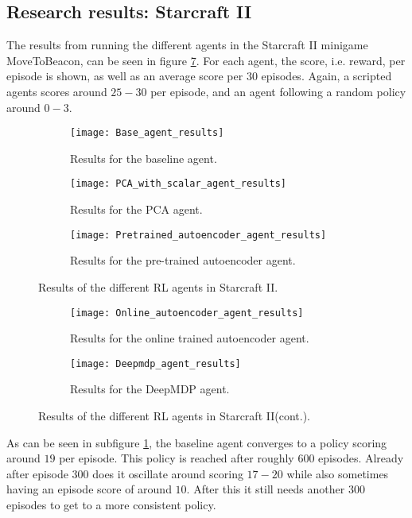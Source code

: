 \subsection{Research results: Starcraft II}\label{research-results-pysc2}
The results from running the different agents in the Starcraft II minigame MoveToBeacon, can be seen in figure \ref{fig:results-agents}. For each agent, the score, i.e. reward, per episode is shown, as well as an average score per $30$ episodes. Again, a scripted agents scores around $25-30$ per episode, and an agent following a random policy around $0-3$.


\begin{figure}[h!]
	\centering
	\begin{subfigure}[b]{0.75\textwidth}
		\texttt{[image: Base\_agent\_results]}
		\caption{Results for the baseline agent.}
		\label{fig:results-base} 
	\end{subfigure}
	\begin{subfigure}[b]{0.75\textwidth}
		\texttt{[image: PCA\_with\_scalar\_agent\_results]}
		\caption{Results for the PCA agent.}
		\label{fig:results-pca}
	\end{subfigure}
	\begin{subfigure}[b]{0.75\textwidth}
		\texttt{[image: Pretrained\_autoencoder\_agent\_results]}
		\caption{Results for the pre-trained autoencoder agent.}
		\label{fig:results-ae}
	\end{subfigure}
	\caption{Results of the different RL agents in Starcraft II.}
\end{figure}%
\begin{figure}[ht]\ContinuedFloat
	\begin{subfigure}[b]{0.75\textwidth}
		\texttt{[image: Online\_autoencoder\_agent\_results]}
		\caption{Results for the online trained autoencoder agent.}
		\label{fig:results-online-ae}
	\end{subfigure}
	\begin{subfigure}[b]{0.75\textwidth}
		\texttt{[image: Deepmdp\_agent\_results]}
		\caption{Results for the DeepMDP agent.}
		\label{fig:results-deepmdp}
	\end{subfigure}
	\caption{Results of the different RL agents in Starcraft II(cont.).}
	\label{fig:results-agents}
\end{figure}

As can be seen in subfigure \ref{fig:results-base}, the baseline agent converges to a policy scoring around $19$ per episode. This policy is reached after roughly $600$ episodes. Already after episode $300$ does it oscillate around scoring $17-20$ while also sometimes having an episode score of around $10$. After this it still needs another $300$ episodes to get to a more consistent policy.

